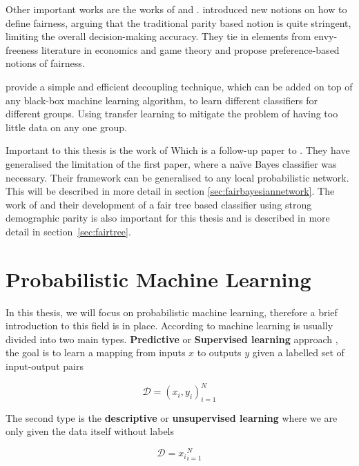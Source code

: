 Other important works are the works of \cite{Zafar:2017:NIPS} and \citet{Dwork:2018:PMLR}. \citet{Zafar:2017:NIPS} introduced new notions on how to define fairness, arguing that the traditional parity based notion is  quite stringent, limiting the overall decision-making accuracy. They tie in elements from envy-freeness literature in economics and game theory and propose preference-based notions of fairness. 

\citet{Dwork:2018:PMLR} provide a simple and efficient decoupling technique, which can be added on top of any black-box machine learning algorithm, to learn different classifiers for different groups. Using transfer learning to mitigate the problem of having too little data on any one group.

Important to this thesis is the work of \citet{Choi:2021:AIII} Which is a follow-up paper to \cite{Calders:20210:DMKD}. They have generalised the limitation of the first paper, where a naïve Bayes classifier was necessary. Their framework can be generalised to any local probabilistic network. This will be described in more detail in section \ref{sec:fairbayesiannetwork}. The work of \citet{Antonio:2021:arXiv} and their development of a fair tree based classifier using strong demographic parity is also important for this thesis and is described in more detail in section~\ref{sec:fairtree}.

\section{Probabilistic Machine Learning}
\label{sec:probmac}

In this thesis, we will focus on probabilistic machine learning, therefore a brief introduction to this field is in place. According to \citet{Murphy:2012:Book} machine learning is usually divided into two main types. \textbf{Predictive} or \textbf{Supervised learning} approach \cite[p.~2]{Murphy:2012:Book}, the goal is to learn a mapping from inputs $x$ to outputs $y$ given a labelled set of input-output pairs

\begin{equation*}
    \mathcal{D} = {(x_i, y_i)}_{i=1}^N
\end{equation*}

The second type is the \textbf{descriptive} or \textbf{unsupervised learning} where we are only given the data itself without labels

\begin{equation*}
    \mathcal{D} = {x_i}_{i=1}^N
\end{equation*}

